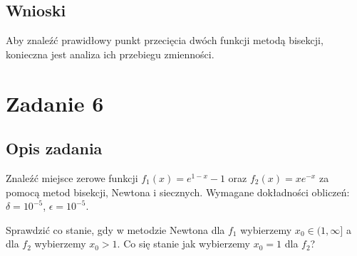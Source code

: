 \documentclass{article}
\begin{document}
\subsection*{Wnioski}
Aby znaleźć prawidłowy punkt przecięcia dwóch funkcji metodą bisekcji, konieczna jest analiza ich przebiegu zmienności. 
\section*{Zadanie 6}
\subsection*{Opis zadania}
Znaleźć miejsce zerowe funkcji $f_1(x) = e^{1-x} - 1$ oraz $f_2(x) = xe^{-x}$ za pomocą metod bisekcji, Newtona i siecznych. Wymagane dokładności obliczeń: $\delta = 10^{-5}$, $\epsilon=10^{-5}$.

Sprawdzić co stanie, gdy w metodzie Newtona dla $f_1$ wybierzemy $x_0 \in (1, \infty]$ a dla $f_2$ wybierzemy $x_0 > 1$. Co się stanie jak wybierzemy $x_0 = 1$ dla $f_2$?
\end{document}
